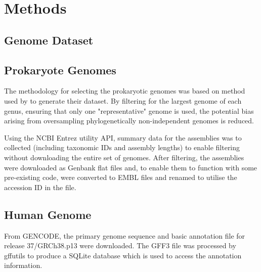 \documentclass[../main.tex]{subfile}
\begin{document}
 \section{Methods}

    \subsection{Genome Dataset}
        \subsection{Prokaryote Genomes}
            The methodology for selecting the prokaryotic genomes was based on method used by \autocite{Ho2019} to generate their dataset. By filtering for the largest genome of each genus, ensuring that only one "representative" genome is used, the potential bias arising from oversampling phylogenetically non-independent genomes is reduced.

            Using the NCBI Entrez utility API, summary data for the assemblies was to collected (including taxonomic IDs and assembly lengths) to enable filtering without downloading the entire set of genomes. After filtering, the assemblies were downloaded as Genbank flat files and, to enable them to function with some pre-existing code, were converted to EMBL files and renamed to utilise the accession ID in the file.


        \subsection{Human Genome}
            From GENCODE, the primary genome sequence and basic annotation file for release 37/GRCh38.p13 were downloaded. The GFF3 file was processed by gffutils to produce a SQLite database which is used to access the annotation information.
\end{document}

